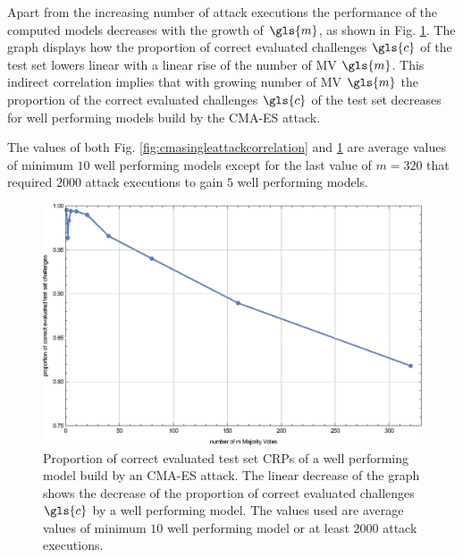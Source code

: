 Apart from the increasing number of attack executions the performance of the computed models decreases with the growth of $\gls{m}$, as shown in Fig. \ref{fig:cmasingleattackcorrectness}.
The graph displays how the proportion of correct evaluated challenges $\gls{c}$ of the test set lowers linear with a linear rise of the number of \ac{MV} $\gls{m}$.
This indirect correlation implies that with growing number of \ac{MV} $\gls{m}$ the proportion of the correct evaluated challenges $\gls{c}$ of the test set decreases for well performing models build by the \ac{CMA-ES} attack.

The values of both Fig. \ref{fig:cmasingleattackcorrelation} and \ref{fig:cmasingleattackcorrectness} are average values of minimum $10$ well performing models except for the last value of $m = 320$ that required $2000$ attack executions to gain $5$ well performing models.

\begin{figure}[ht]
\includegraphics[width=1.00\textwidth]{images/single-mv-classification-cma-attack-correctness.eps}
\caption[Proportion of correct evaluated test set challenges of a model approximated by the \acs{CMA-ES} attack]{Proportion of correct evaluated test set \acp{CRP} of a well performing model build by an \ac{CMA-ES} attack. The linear decrease of the graph shows the decrease of the proportion of correct evaluated challenges $\gls{c}$ by a well performing model. The values used are average values of minimum $10$ well performing model or at least $2000$ attack executions.}
\label{fig:cmasingleattackcorrectness}
\end{figure}

